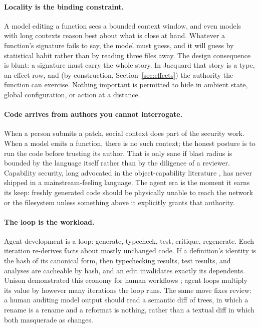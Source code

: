 \documentclass[11pt]{article}
\newcommand{\jacquard}{Jacquard}
\begin{document}
\paragraph{Locality is the binding constraint.}
A model editing a function sees a bounded context window, and even models with long contexts reason best about what is close at hand. Whatever a function's signature fails to say, the model must guess, and it will guess by statistical habit rather than by reading three files away. The design consequence is blunt: a signature must carry the whole story. In \jacquard{} that story is a type, an effect row, and (by construction, Section~\ref{sec:effects}) the authority the function can exercise. Nothing important is permitted to hide in ambient state, global configuration, or action at a distance.

\paragraph{Code arrives from authors you cannot interrogate.}
When a person submits a patch, social context does part of the security work. When a model emits a function, there is no such context; the honest posture is to run the code before trusting its author. That is only sane if blast radius is bounded by the language itself rather than by the diligence of a reviewer. Capability security, long advocated in the object-capability literature \cite{miller2006}, has never shipped in a mainstream-feeling language. The agent era is the moment it earns its keep: freshly generated code should be physically unable to reach the network or the filesystem unless something above it explicitly grants that authority.

\paragraph{The loop is the workload.}
Agent development is a loop: generate, typecheck, test, critique, regenerate. Each iteration re-derives facts about mostly unchanged code. If a definition's identity is the hash of its canonical form, then typechecking results, test results, and analyses are cacheable by hash, and an edit invalidates exactly its dependents. Unison demonstrated this economy for human workflows \cite{unison}; agent loops multiply its value by however many iterations the loop runs. The same move fixes review: a human auditing model output should read a semantic diff of trees, in which a rename is a rename and a reformat is nothing, rather than a textual diff in which both masquerade as changes.
\end{document}
